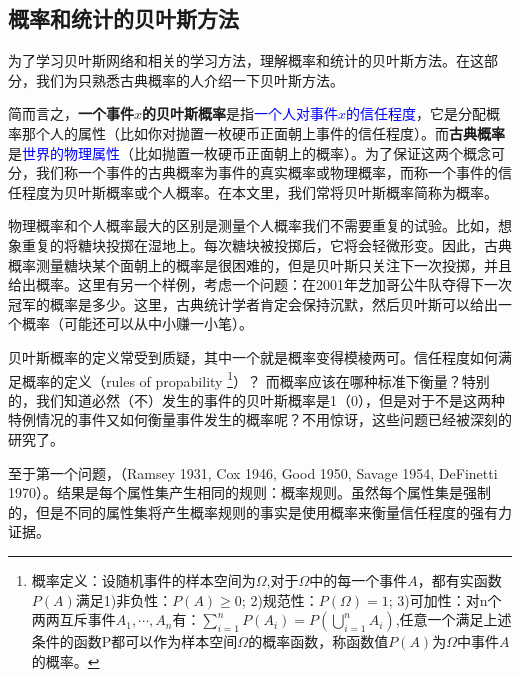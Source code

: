 \documentclass[10pt,a4paper]{article}
\begin{document}
\begin{CJK*}{UTF8}{gkai}
\section{概率和统计的贝叶斯方法}
为了学习贝叶斯网络和相关的学习方法，理解概率和统计的贝叶斯方法。在这部分，我们为只熟悉古典概率的人介绍一下贝叶斯方法。

简而言之，\textbf{一个事件$x$的贝叶斯概率}是指\textcolor{blue}{一个人对事件$x$的信任程度}，它是分配概率那个人的属性（比如你对抛置一枚硬币正面朝上事件的信任程度）。而\textbf{古典概率}是\textcolor{blue}{世界的物理属性}（比如抛置一枚硬币正面朝上的概率）。为了保证这两个概念可分，我们称一个事件的古典概率为事件的真实概率或物理概率，而称一个事件的信任程度为贝叶斯概率或个人概率。在本文里，我们常将贝叶斯概率简称为概率。




物理概率和个人概率最大的区别是测量个人概率我们不需要重复的试验。比如，想象重复的将糖块投掷在湿地上。每次糖块被投掷后，它将会轻微形变。因此，古典概率测量糖块某个面朝上的概率是很困难的，但是贝叶斯只关注下一次投掷，并且给出概率。这里有另一个样例，考虑一个问题：在2001年芝加哥公牛队夺得下一次冠军的概率是多少。这里，古典统计学者肯定会保持沉默，然后贝叶斯可以给出一个概率（可能还可以从中小赚一小笔）。


贝叶斯概率的定义常受到质疑，其中一个就是概率变得模棱两可。信任程度如何满足概率的定义（rules of propability
\footnote{概率定义：设随机事件的样本空间为$\Omega$,对于$\Omega$中的每一个事件$A$，都有实函数$P(A)$满足1)非负性：$P(A)\geq0$; 2)规范性：$P(\Omega)=1$; 3)可加性：对n个两两互斥事件$A_1,\cdots,A_n$有：$\sum_{i=1}^n P(A_i)=P(\bigcup_{i=1}^n A_i)$,任意一个满足上述条件的函数P都可以作为样本空间$\Omega$的概率函数，称函数值$P(A)$为$\Omega$中事件$A$的概率。}）？
而概率应该在哪种标准下衡量？特别的，我们知道必然（不）发生的事件的贝叶斯概率是1（0），但是对于不是这两种特例情况的事件又如何衡量事件发生的概率呢？不用惊讶，这些问题已经被深刻的研究了。


至于第一个问题，（Ramsey 1931, Cox 1946, Good 1950, Savage 1954, DeFinetti 1970）。结果是每个属性集产生相同的规则：概率规则。虽然每个属性集是强制的，但是不同的属性集将产生概率规则的事实是使用概率来衡量信任程度的强有力证据。



\end{CJK*}
\end{document}
